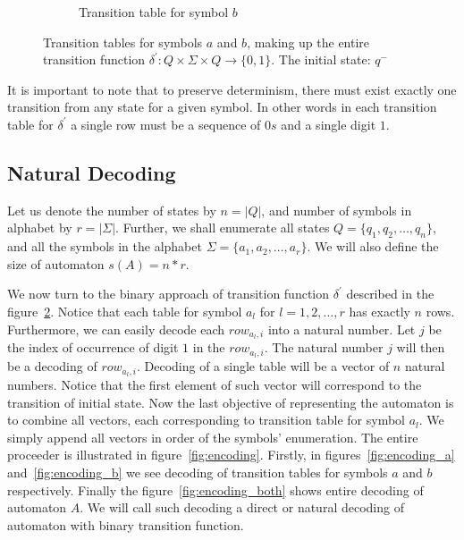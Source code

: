 \documentclass{mini}
\begin{document}
\begin{figure}[H]
\begin{center}
\begin{subfigure}{.5\textwidth}
\begin{tabular}{|P{1.0cm} || P{0.8cm} | P{0.8cm} | P{0.8cm} | P{0.8cm}|}
            \end{tabular}
            
            \caption{Transition table for symbol $b$}
            \label{fig:ttable_bin_b}
            
        \end{subfigure}%
        
        
        \caption{Transition tables for symbols $a$ and $b$, making up the entire transition function $\delta^{'}: Q \times \Sigma \times Q \rightarrow \{0,1\}$. The initial state: $q^-$}
        
        \label{fig:ttable_bin}
    \end{center}
\end{figure}

It is important to note that to preserve determinism, there must exist exactly one transition from any state for a given symbol. In other words in each transition table for $\delta^{'}$ a single row must be a sequence of $0s$ and a single digit $1$.

\subsection{Natural Decoding} \label{sec:auto_dec}

Let us denote the number of states by $n = |Q|$, and number of symbols in alphabet by $r = |\Sigma|$. Further, we shall enumerate all states 	$Q = \{q_1, q_2, \ldots, q_n\}$, and all the symbols in the alphabet 	$\Sigma = \{a_1, a_2, \ldots, a_r\}$. We will also define the size of automaton $s(A) = n*r$.

We now turn to the binary approach of transition function $\delta^{'}$ described in the figure~\ref{fig:ttable_bin}. Notice that each table for symbol $a_l$ for $l = 1,2, \dots, r$ has exactly $n$ rows. Furthermore, we can easily decode each $row_{a_l, i}$ into a natural number. Let $j$ be the index of occurrence of digit $1$ in the $row_{a_l, i}$. The natural number $j$ will then be a decoding of $row_{a_l, i}$. Decoding of a single table will be a vector of $n$ natural numbers. Notice that the first element of such vector will correspond to the transition of initial state. Now the last objective of representing the automaton is to combine all vectors, each corresponding to transition table for symbol $a_{l}$. We simply append all vectors in order of the symbols' enumeration. The entire proceeder is illustrated in figure~\ref{fig:encoding}. Firstly, in figures~\ref{fig:encoding_a} and~\ref{fig:encoding_b} we see decoding of transition tables for symbols $a$ and $b$ respectively. Finally the figure~\ref{fig:encoding_both} shows entire decoding of automaton $A$. We will call such decoding a direct or natural decoding of automaton with binary transition function.
\end{document}
